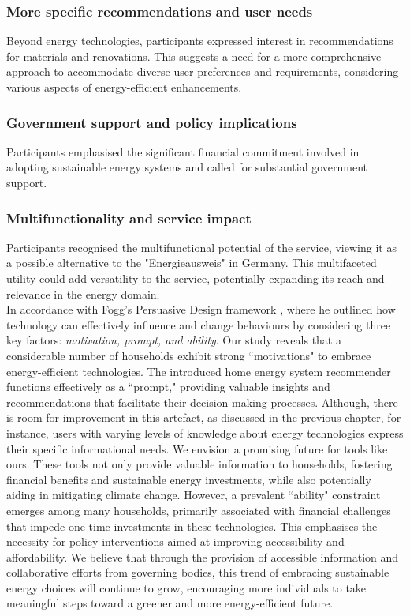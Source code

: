 \subsubsection*{More specific recommendations and user needs}

Beyond energy technologies, participants expressed interest in recommendations for materials and renovations. 
This suggests a need for a more comprehensive approach to accommodate diverse user preferences and requirements, considering various aspects of energy-efficient enhancements.


\subsubsection*{Government support and policy implications}

Participants emphasised the significant financial commitment involved in adopting sustainable energy systems and called for substantial government support. 


\subsubsection*{Multifunctionality and service impact}

Participants recognised the multifunctional potential of the service, viewing it as a possible alternative to the "Energieausweis" in Germany. 
This multifaceted utility could add versatility to the service, potentially expanding its reach and relevance in the energy domain. 
\\


\noindent
In accordance with Fogg's Persuasive Design framework \cite{Fogg2009}, 
where he outlined how technology can effectively influence and change behaviours by considering three key factors: 
\emph{motivation, prompt, and ability}. 
Our study reveals that a considerable number of households exhibit strong ``motivations" to embrace energy-efficient technologies. 
The introduced home energy system recommender functions effectively as a ``prompt," providing valuable insights and recommendations that facilitate their decision-making processes. 
Although, there is room for improvement in this artefact, as discussed in the previous chapter,
for instance, users with varying levels of knowledge about energy technologies express their specific informational needs.
We envision a promising future for tools like ours.
These tools not only provide valuable information to households, fostering financial benefits and sustainable energy investments, while also potentially aiding in mitigating climate change. 
However, a prevalent ``ability" constraint emerges among many households,
primarily associated with financial challenges that impede one-time investments in these technologies. 
This emphasises the necessity for policy interventions aimed at improving accessibility and affordability. 
We believe that through the provision of accessible information and collaborative efforts from governing bodies, this trend of embracing sustainable energy choices will continue to grow, encouraging more individuals to take meaningful steps toward a greener and more energy-efficient future.  


